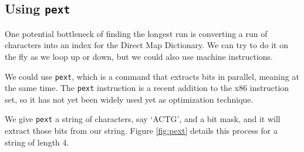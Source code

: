 \documentclass[12pt,twoside]{reedthesis}
\begin{document}
\hypertarget{using-pext}{%
\subsection{\texorpdfstring{Using \texttt{pext}}{Using pext}}\label{using-pext}}

One potential bottleneck of finding the longest run is converting a run of characters into an index for the Direct Map Dictionary. We can try to do it on the fly as we loop up or down, but we could also use machine instructions.

We could use \texttt{pext}, which is a command that extracts bits in parallel, meaning at the same time. The \texttt{pext} instruction is a recent addition to the x86 instruction set, so it has not yet been widely used yet as optimization technique.

We give \texttt{pext} a string of characters, say `ACTG', and a bit mask, and it will extract those bits from our string. Figure \ref{fig:pext} details this process for a string of length 4.
\end{document}
